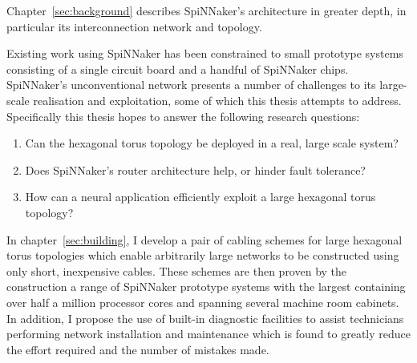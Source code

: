 Chapter~\ref{sec:background} describes SpiNNaker's architecture in greater
depth, in particular its interconnection network and topology.

Existing work using SpiNNaker has been constrained to small prototype systems
consisting of a single circuit board and a handful of SpiNNaker chips.
SpiNNaker's unconventional network presents a number of challenges to its
large-scale realisation and exploitation, some of which this thesis attempts to
address. Specifically this thesis hopes to answer the following research
questions:

\begin{enumerate}
	
	\item Can the hexagonal torus topology be deployed in a real, large scale
	system?
	
	\item Does SpiNNaker's router architecture help, or hinder fault tolerance?
	
	\item How can a neural application efficiently exploit a large hexagonal
	torus topology?
	
\end{enumerate}

%

In chapter~\ref{sec:building}, I develop a pair of cabling schemes for
large hexagonal torus topologies which enable arbitrarily large networks to be
constructed using only short, inexpensive cables. These schemes are then proven
by the construction a range of SpiNNaker prototype systems with the largest
containing over half a million processor cores and spanning several machine
room cabinets. In addition, I propose the use of built-in diagnostic facilities
to assist technicians performing network installation and maintenance which is
found to greatly reduce the effort required and the number of mistakes made.

